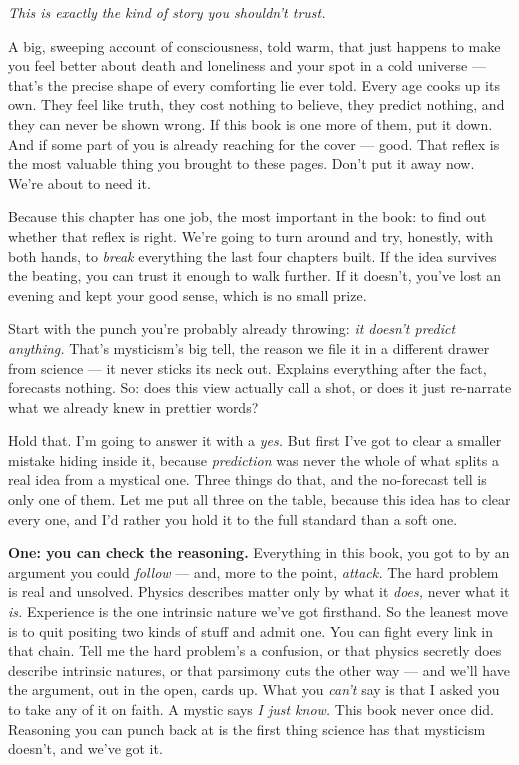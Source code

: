 \documentclass[11pt,openany]{book}
\begin{document}
\textit{This is exactly the kind of story you shouldn’t trust.}

A big, sweeping account of consciousness, told warm, that just happens to make you feel better about death and loneliness and your spot in a cold universe — that’s the precise shape of every comforting lie ever told. Every age cooks up its own. They feel like truth, they cost nothing to believe, they predict nothing, and they can never be shown wrong. If this book is one more of them, put it down. And if some part of you is already reaching for the cover — good. That reflex is the most valuable thing you brought to these pages. Don’t put it away now. We’re about to need it.

Because this chapter has one job, the most important in the book: to find out whether that reflex is right. We’re going to turn around and try, honestly, with both hands, to \textit{break} everything the last four chapters built. If the idea survives the beating, you can trust it enough to walk further. If it doesn’t, you’ve lost an evening and kept your good sense, which is no small prize.

Start with the punch you’re probably already throwing: \textit{it doesn’t predict anything.} That’s mysticism’s big tell, the reason we file it in a different drawer from science — it never sticks its neck out. Explains everything after the fact, forecasts nothing. So: does this view actually call a shot, or does it just re-narrate what we already knew in prettier words?

Hold that. I’m going to answer it with a \textit{yes.} But first I’ve got to clear a smaller mistake hiding inside it, because \textit{prediction} was never the whole of what splits a real idea from a mystical one. Three things do that, and the no-forecast tell is only one of them. Let me put all three on the table, because this idea has to clear every one, and I’d rather you hold it to the full standard than a soft one.

\textbf{One: you can check the reasoning.} Everything in this book, you got to by an argument you could \textit{follow} — and, more to the point, \textit{attack.} The hard problem is real and unsolved. Physics describes matter only by what it \textit{does,} never what it \textit{is.} Experience is the one intrinsic nature we’ve got firsthand. So the leanest move is to quit positing two kinds of stuff and admit one. You can fight every link in that chain. Tell me the hard problem’s a confusion, or that physics secretly does describe intrinsic natures, or that parsimony cuts the other way — and we’ll have the argument, out in the open, cards up. What you \textit{can’t} say is that I asked you to take any of it on faith. A mystic says \textit{I just know.} This book never once did. Reasoning you can punch back at is the first thing science has that mysticism doesn’t, and we’ve got it.
\end{document}
